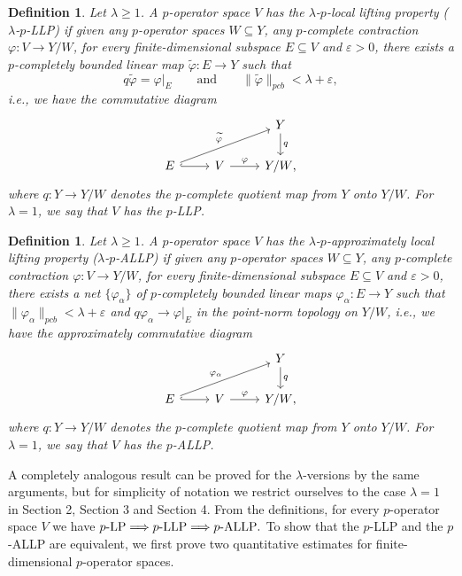 \documentclass[12pt]{article}
\newtheorem{definition}[theorem]{Definition}
\newcommand{\pcb}{pcb}
\begin{document}
\begin{definition}\label{def:lambda-llp}
Let $\lambda\geq 1$.  A $p$-operator space $V$ has the
\emph{$\lambda$-$p$-local lifting property} ($\lambda$-$p$-LLP) if given any $p$-operator spaces $W\subseteq Y$, any $p$-complete contraction
$\varphi:V\to Y/W$, for every finite-dimensional subspace $E\subseteq V$ and $\varepsilon>0$, there exists a $p$-completely bounded
linear map $\widetilde{\varphi}:E\to Y$ such that
\[
        q\widetilde{\varphi}=\varphi|_E
        \qquad\text{and}\qquad
        \|\widetilde{\varphi}\|_{\pcb}<\lambda+\varepsilon,
\]
i.e., we have the commutative diagram
\begin{equation*}
\begin{tikzcd}
& & Y \arrow{d}{q} \\
E \arrow[hook]{r} \arrow{rru}{\widetilde{\varphi}} & V \arrow{r}{\varphi} & Y/W\text{,}
\end{tikzcd}
\end{equation*}
where $q:Y\to Y/W$ denotes the
$p$-complete quotient map from $Y$ onto $Y/W$.
For $\lambda=1$, we say that $V$ has the $p$-LLP.
\end{definition}

\begin{definition}\label{def:lambda-allp}
Let $\lambda\geq 1$.  A $p$-operator space $V$ has the
\emph{$\lambda$-$p$-approximately local lifting property} ($\lambda$-$p$-ALLP) if
given any $p$-operator spaces $W\subseteq Y$, any $p$-complete contraction
$\varphi:V\to Y/W$, for every finite-dimensional subspace $E\subseteq V$ and
$\varepsilon>0$, there exists a net $\{\varphi_\alpha\}$ of $p$-completely bounded
linear maps $\varphi_\alpha:E\to Y$ such that
$\|\varphi_\alpha\|_{\pcb}<\lambda+\varepsilon$
and $q\varphi_\alpha\to \varphi|_E$ in the point-norm topology on $Y/W$, i.e., we
have the approximately commutative diagram
\begin{equation*}
\begin{tikzcd}
& & Y \arrow{d}{q} \\
E \arrow[hook]{r} \arrow{rru}{\varphi_\alpha} & V \arrow{r}{\varphi} & Y/W\text{,}
\end{tikzcd}
\end{equation*}
where $q:Y\to Y/W$ denotes the
$p$-complete quotient map from $Y$ onto $Y/W$.
For $\lambda=1$, we say that $V$ has the $p$-ALLP.
\end{definition}


A completely analogous result can be proved for the $\lambda$-versions by the same arguments, but for simplicity of notation we restrict ourselves to the case $\lambda=1$ in Section 2, Section 3 and Section 4. From the definitions, for every $p$-operator space $V$ we have
\(
        p\hbox{-LP}
        \Longrightarrow
        p\hbox{-LLP}
        \Longrightarrow
        p\hbox{-ALLP}.
\)
To show that the $p$-LLP and the $p$-ALLP are equivalent, we first prove two quantitative estimates for finite-dimensional $p$-operator spaces. 
\end{document}
